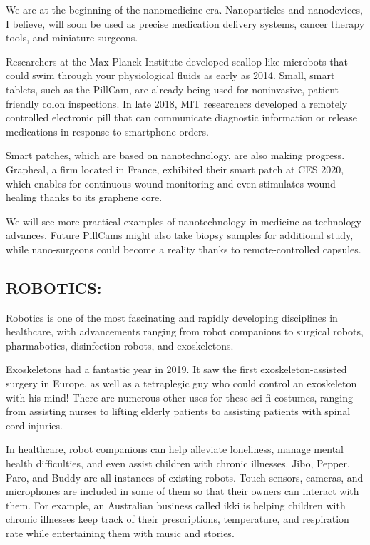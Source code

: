 \documentclass[12pt]{article}
\begin{document}
We are at the beginning of the nanomedicine era. Nanoparticles and nanodevices, I believe, will soon be used as precise medication delivery systems, cancer therapy tools, and miniature surgeons.

Researchers at the Max Planck Institute developed scallop-like microbots that could swim through your physiological fluids as early as 2014. Small, smart tablets, such as the PillCam, are already being used for noninvasive, patient-friendly colon inspections. In late 2018, MIT researchers developed a remotely controlled electronic pill that can communicate diagnostic information or release medications in response to smartphone orders.


Smart patches, which are based on nanotechnology, are also making progress. Grapheal, a firm located in France, exhibited their smart patch at CES 2020, which enables for continuous wound monitoring and even stimulates wound healing thanks to its graphene core.

We will see more practical examples of nanotechnology in medicine as technology advances. Future PillCams might also take biopsy samples for additional study, while nano-surgeons could become a reality thanks to remote-controlled capsules.

\subsection{ROBOTICS:}
 
 
 
 Robotics is one of the most fascinating and rapidly developing disciplines in healthcare, with advancements ranging from robot companions to surgical robots, pharmabotics, disinfection robots, and exoskeletons.

Exoskeletons had a fantastic year in 2019. It saw the first exoskeleton-assisted surgery in Europe, as well as a tetraplegic guy who could control an exoskeleton with his mind! There are numerous other uses for these sci-fi costumes, ranging from assisting nurses to lifting elderly patients to assisting patients with spinal cord injuries.


In healthcare, robot companions can help alleviate loneliness, manage mental health difficulties, and even assist children with chronic illnesses. Jibo, Pepper, Paro, and Buddy are all instances of existing robots. Touch sensors, cameras, and microphones are included in some of them so that their owners can interact with them. For example, an Australian business called ikki is helping children with chronic illnesses keep track of their prescriptions, temperature, and respiration rate while entertaining them with music and stories.
\end{document}
